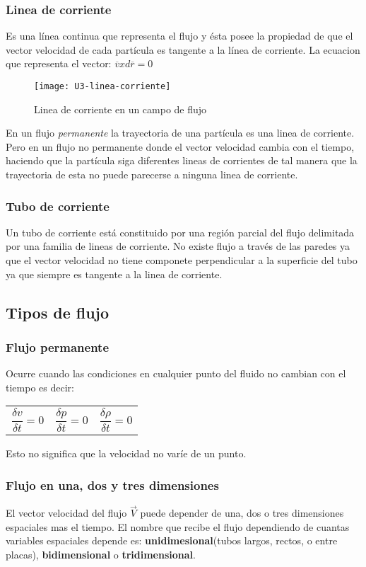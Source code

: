 \subsubsection{Linea de corriente}
Es una línea continua que representa el flujo y ésta posee la propiedad de que el vector velocidad de cada partícula es tangente a la línea de corriente. La ecuacion que representa el vector: $ \overline{v} x d\overline{r} = 0$

\begin{figure}[h]
	\centering
	\texttt{[image: U3-linea-corriente]}
	\caption{Linea de corriente en un campo de flujo}
\end{figure}

En un flujo \emph{permanente} la trayectoria de una partícula es una linea de corriente. Pero en un flujo no permanente donde el vector velocidad cambia con el tiempo, haciendo que la partícula siga diferentes lineas de corrientes de tal manera que la trayectoria de esta no puede parecerse a ninguna linea de corriente.

\subsubsection{Tubo de corriente}
Un tubo de corriente está constituido por una región parcial del flujo delimitada por una familia de lineas de corriente. No existe flujo a través de las paredes ya que el vector velocidad no tiene componete perpendicular a la superficie del tubo ya que siempre es tangente a la linea de corriente.

\subsection{Tipos de flujo}
\subsubsection{Flujo permanente}
Ocurre cuando las condiciones en cualquier punto del fluido no cambian con el tiempo es decir:

\begin{tabular}{r c l}
	\centering
	$\dfrac{\delta v}{\delta t} = 0$ & $\dfrac{\delta p}{\delta t} =0$ & $ \dfrac{\delta \rho}{\delta t}=0$
\end{tabular}

Esto no significa que la velocidad no varíe de un punto.

\subsubsection{Flujo en una, dos y tres dimensiones}
El vector velocidad del flujo $\vec{V}$ puede depender de una, dos o tres dimensiones espaciales mas el tiempo. El nombre que recibe el flujo dependiendo de cuantas variables espaciales depende es: \textbf{unidimesional}(tubos largos, rectos, o entre placas), \textbf{bidimensional} o \textbf{tridimensional}. 


